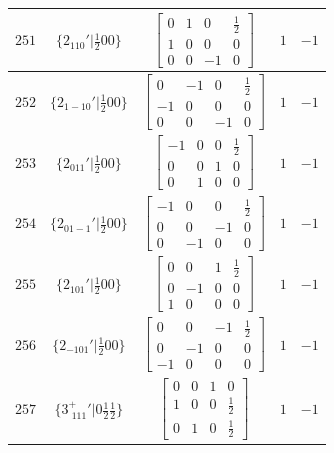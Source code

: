 \documentclass[fleqn,8pt]{jsarticle}
\begin{document}
\begin{longtable}{ccccc}
$ 251 $ & $ \{2{}_{110}{}'|\frac{1}{2} 0 0\} $ & $ \begin{bmatrix} 0 & 1 & 0 & \frac{1}{2} \\ 1 & 0 & 0 & 0 \\ 0 & 0 & -1 & 0 \end{bmatrix} $ & $ 1 $ & $ -1 $ \\ \hline
$ 252 $ & $ \{2{}_{1-10}{}'|\frac{1}{2} 0 0\} $ & $ \begin{bmatrix} 0 & -1 & 0 & \frac{1}{2} \\ -1 & 0 & 0 & 0 \\ 0 & 0 & -1 & 0 \end{bmatrix} $ & $ 1 $ & $ -1 $ \\ \hline
$ 253 $ & $ \{2{}_{011}{}'|\frac{1}{2} 0 0\} $ & $ \begin{bmatrix} -1 & 0 & 0 & \frac{1}{2} \\ 0 & 0 & 1 & 0 \\ 0 & 1 & 0 & 0 \end{bmatrix} $ & $ 1 $ & $ -1 $ \\ \hline
$ 254 $ & $ \{2{}_{01-1}{}'|\frac{1}{2} 0 0\} $ & $ \begin{bmatrix} -1 & 0 & 0 & \frac{1}{2} \\ 0 & 0 & -1 & 0 \\ 0 & -1 & 0 & 0 \end{bmatrix} $ & $ 1 $ & $ -1 $ \\ \hline
$ 255 $ & $ \{2{}_{101}{}'|\frac{1}{2} 0 0\} $ & $ \begin{bmatrix} 0 & 0 & 1 & \frac{1}{2} \\ 0 & -1 & 0 & 0 \\ 1 & 0 & 0 & 0 \end{bmatrix} $ & $ 1 $ & $ -1 $ \\ \hline
$ 256 $ & $ \{2{}_{-101}{}'|\frac{1}{2} 0 0\} $ & $ \begin{bmatrix} 0 & 0 & -1 & \frac{1}{2} \\ 0 & -1 & 0 & 0 \\ -1 & 0 & 0 & 0 \end{bmatrix} $ & $ 1 $ & $ -1 $ \\ \hline
$ 257 $ & $ \{3^{+}_{\,\,111}{}'|0 \frac{1}{2} \frac{1}{2}\} $ & $ \begin{bmatrix} 0 & 0 & 1 & 0 \\ 1 & 0 & 0 & \frac{1}{2} \\ 0 & 1 & 0 & \frac{1}{2} \end{bmatrix} $ & $ 1 $ & $ -1 $ \\ \hline

\end{longtable}
\end{document}
